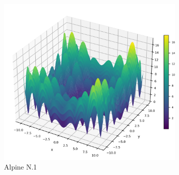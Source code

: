 

\enlargethispage{3\baselineskip}
\begin{figure}[!hb]
\renewcommand\thesubfigure{A.\arabic{subfigure}} %
    \centering
    \begin{subfigure}{0.32\textwidth}
        \centering
        \includegraphics[width=1\textwidth]{Figures/benchmark_plots/Alpine_N1_maximized.png}
        \caption{Alpine N.1}
    \end{subfigure}
    \begin{subfigure}{0.32\textwidth}
        \centering

\end{subfigure}
\end{figure}
